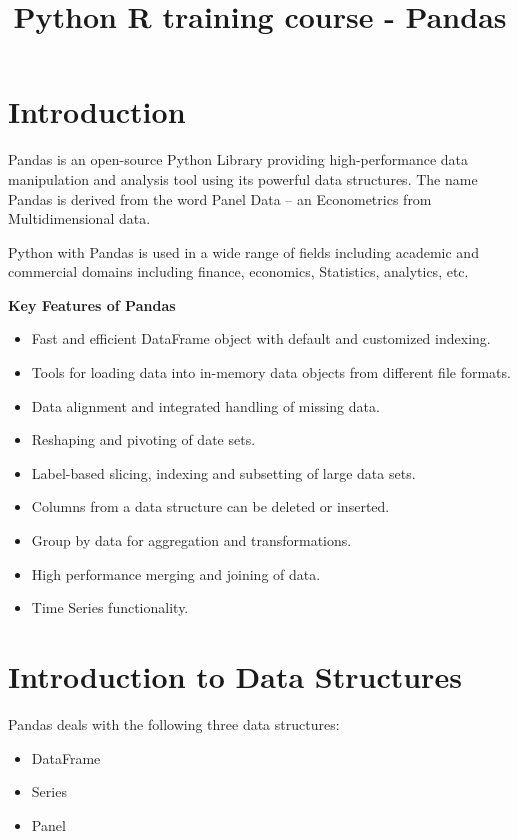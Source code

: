 \documentclass[11pt]{article}
\title{Python R training course - Pandas}
\providecommand{\tightlist}{%
      \setlength{\itemsep}{0pt}\setlength{\parskip}{0pt}}
\begin{document}
    
    
    \maketitle
    
    

    
    \section{Introduction}\label{introduction}

Pandas is an open-source Python Library providing high-performance data
manipulation and analysis tool using its powerful data structures. The
name Pandas is derived from the word Panel Data -- an Econometrics from
Multidimensional data.

Python with Pandas is used in a wide range of fields including academic
and commercial domains including finance, economics, Statistics,
analytics, etc.

\textbf{Key Features of Pandas}

\begin{itemize}
\tightlist
\item
  Fast and efficient DataFrame object with default and customized
  indexing.
\item
  Tools for loading data into in-memory data objects from different file
  formats.
\item
  Data alignment and integrated handling of missing data.
\item
  Reshaping and pivoting of date sets.
\item
  Label-based slicing, indexing and subsetting of large data sets.
\item
  Columns from a data structure can be deleted or inserted.
\item
  Group by data for aggregation and transformations.
\item
  High performance merging and joining of data.
\item
  Time Series functionality.
\end{itemize}

    \section{Introduction to Data
Structures}\label{introduction-to-data-structures}

Pandas deals with the following three data structures:

\begin{itemize}
\tightlist
\item
  DataFrame
\item
  Series
\item
  Panel
\end{itemize}
\end{document}
